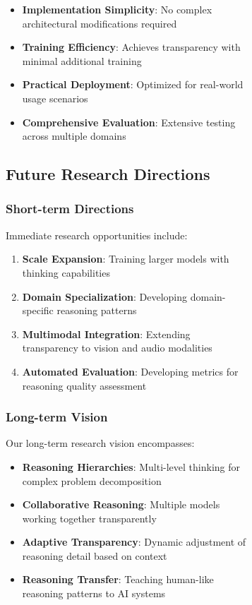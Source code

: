 \begin{figure}[H]
\begin{table}[H]
\begin{figure}[H]
\begin{table}[H]
\begin{table}[H]
\begin{itemize}
    \item \textbf{Implementation Simplicity}: No complex architectural modifications required
    \item \textbf{Training Efficiency}: Achieves transparency with minimal additional training
    \item \textbf{Practical Deployment}: Optimized for real-world usage scenarios
    \item \textbf{Comprehensive Evaluation}: Extensive testing across multiple domains
\end{itemize}

\subsection{Future Research Directions}

\subsubsection{Short-term Directions}

Immediate research opportunities include:

\begin{enumerate}
    \item \textbf{Scale Expansion}: Training larger models with thinking capabilities
    \item \textbf{Domain Specialization}: Developing domain-specific reasoning patterns
    \item \textbf{Multimodal Integration}: Extending transparency to vision and audio modalities
    \item \textbf{Automated Evaluation}: Developing metrics for reasoning quality assessment
\end{enumerate}

\subsubsection{Long-term Vision}

Our long-term research vision encompasses:

\begin{itemize}
    \item \textbf{Reasoning Hierarchies}: Multi-level thinking for complex problem decomposition
    \item \textbf{Collaborative Reasoning}: Multiple models working together transparently
    \item \textbf{Adaptive Transparency}: Dynamic adjustment of reasoning detail based on context
    \item \textbf{Reasoning Transfer}: Teaching human-like reasoning patterns to AI systems
\end{itemize}


\end{table}
\end{table}
\end{figure}
\end{table}
\end{figure}
